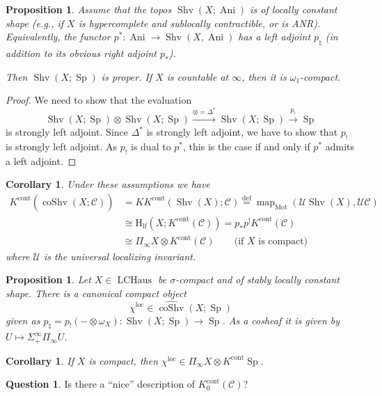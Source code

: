 \documentclass[draft]{amsart}
\renewcommand{\H}{\mathrm{H}}
\newcommand{\wh}[1]{\widehat{#1}}
\newcommand{\cat}[1]{\mathcal{#1}}
\newcommand{\blank}{-} %
\DeclareMathOperator{\Anima}{Ani}
\DeclareMathOperator{\LCHaus}{LCHaus}
\DeclareMathOperator{\coShv}{coShv}
\DeclareMathOperator{\Mot}{Mot}
\DeclareMathOperator{\map}{map}
\DeclareMathOperator{\Shv}{Shv}
\DeclareMathOperator{\Sp}{Sp}
\newtheorem{prop}[thm]{Proposition}
\newtheorem{cor}[thm]{Corollary}
\theoremstyle{definition}
\newtheorem{question}[thm]{Question}
\begin{document}
\begin{prop}
Assume that the topos $\Shv(X;\Anima)$ is of locally constant shape (e.g., if $X$ is hypercomplete and sublocally contractible, or is ANR). Equivalently, the functor $p^*\colon \Anima \to \Shv(X,\Anima)$ has a left adjoint $p_{\natural}$ (in addition to its obvious right adjoint $p_*$).

Then $\Shv(X; \Sp)$ is proper. If $X$ is countable at $\infty$, then it is $\omega_1$-compact.
\end{prop}
\begin{proof}
We need to show that the evaluation
\[
\Shv(X;\Sp) \otimes \Shv(X;\Sp) \xrightarrow{\otimes=\Delta^*} \Shv(X;\Sp) \xrightarrow{p_!} \Sp
\]
is strongly left adjoint. Since $\Delta^*$ is strongly left adjoint, we have to show that $p_!$ is strongly left adjoint. As $p_!$ is dual to $p^*$, this is the case if and only if $p^*$ admits a left adjoint.
\end{proof}

\begin{cor}
Under these assumptions we have
\begin{align*}
K^{\mathrm{cont}}(\wh{\coShv}(X;\cat C)) &= {KK}^{\mathrm{cont}}(\Shv(X); \cat C) \stackrel{\text{def}}{=} \map_{\Mot}(\cat U\Shv(X), \cat U\cat C) \\
&\cong \H_{\mathrm{lf}}(X;K^{\mathrm{cont}}(\cat C)) = p_*p^!K^{\mathrm{cont}}(\cat C) \\
&\cong \Pi_\infty X \otimes K^{\mathrm{cont}}(\cat C) \qquad\text{(if $X$ is compact)}
\end{align*}
where $\cat U$ is the universal localizing invariant.
\end{cor}

\begin{prop}
Let $X\in \LCHaus$ be $\sigma$-compact and of stably locally constant shape.
There is a canonical compact object
\[
\chi^{\mathrm{loc}} \in \wh{\coShv}(X;\Sp)
\]
given as $p_\natural = p_!(\blank\otimes \omega_X) \colon \Shv(X;\Sp) \to \Sp$. As a cosheaf it is given by $U\mapsto \Sigma^\infty_+\Pi_\infty U$.
\end{prop}

\begin{cor}
If $X$ is compact, then $\chi^{\mathrm{loc}} \in \Pi_\infty X\otimes K^{\mathrm{cont}}\Sp$.
\end{cor}

\begin{question}
Is there a \enquote{nice} description of $K_0^{\mathrm{cont}}(\cat C)$?
\end{question}
\end{document}
